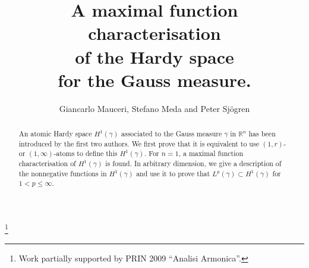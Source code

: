 \documentclass{amsart}                 %
\numberwithin{equation}{section}
\newcommand\1{{\bf 1}}
\newcommand\BR{\mathbb{R}} \newcommand\BRd{\mathbb{R}^d}
\newcommand\ga{\gamma}    \newcommand\Ga{\Gamma}
\newcommand\huat[1]{H^1(#1)}
\begin{document}
\title[]{A maximal function characterisation \\ of the Hardy space \\ for 
the Gauss measure.}



\thanks{Work partially supported by
PRIN 2009 ``Analisi Armonica''.}


\author[G. Mauceri, S. Meda and P. Sj\"ogren]
{Giancarlo Mauceri, Stefano Meda and Peter Sj\"ogren}

\address{G. Mauceri: Dipartimento di Matematica \\
Universit\`a di Genova \\ via Dodecaneso 35, 16146 Genova \\ Italia\\ {\it mauceri@dima.unige.it}}
\address{S. Meda: Dipartimento di Matematica e Applicazioni
\\ Universit\`a di Milano-Bicocca\\
via R.~Cozzi 53\\ 20125 Milano\\ Italy\\ {\it stefano.meda@unimib.it}}
\address{P. Sj\"ogren:  Mathematical Sciences\\ 
University of Gothenburg\\ and  Mathematical Sciences\\Chalmers \\
 SE-412 96 G\"oteborg \\ Sweden\\ {\it peters@chalmers.se}}




\begin{abstract}
An atomic Hardy space  $\huat{\gamma}$ associated to the Gauss measure $\ga$ 
in $\BR^n$ has been introduced by the first two
authors. We first prove that it is equivalent to use $(1,r)$- or $(1,\infty)$-atoms
to define this $\huat{\gamma}$. For $n=1$, a maximal function characterisation
 of $\huat{\gamma}$ is found. In arbitrary dimension, we give  a description of the 
 nonnegative
functions in $\huat{\gamma}$ and  use it to prove 
that $L^p(\gamma)\subset H^1(\gamma)$ for $1<p\le\infty$. 
\end{abstract}
\maketitle
\end{document}

